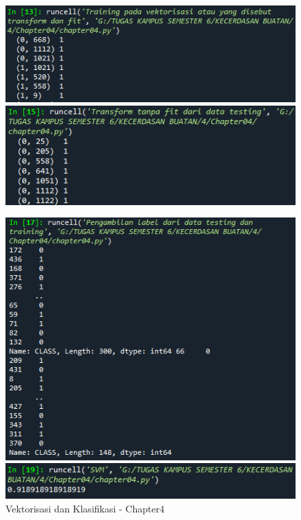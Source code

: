 \begin{enumerate}
\begin{figure}[ht]
		      \centerline{\includegraphics[scale=0.7]{figures/chappter4-4c.png}}
		      \centerline{\includegraphics[scale=0.7]{figures/chappter4-4d.png}}
	      \end{figure}
	      \newpage
	      \begin{figure}[ht]
		      \centerline{\includegraphics[scale=0.7]{figures/chappter4-4e.png}}
		      \centerline{\includegraphics[scale=0.7]{figures/chappter4-4f.png}}
		      \caption{Vektorisasi dan Klasifikasi - Chapter4}
		      \label{Vektorisasi dan Klasifikasi- Chapter4}
	      \end{figure}


\end{enumerate}
